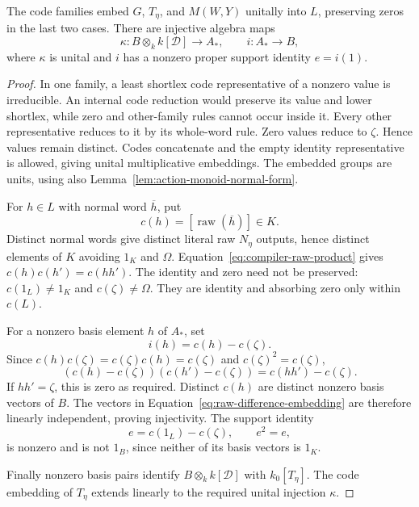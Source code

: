 \begin{lemma}\label{lem:encoding-embeddings}
The code families embed $G$, $T_\eta$, and
$M(W,Y)$ unitally into $L$, preserving
zeros in the last two cases.  There are
injective algebra maps
\begin{equation}\label{eq:encoding-algebra-maps}
 \kappa:B\otimes_k k[\mathcal D]\longrightarrow A_*,
 \qquad i:A_*\longrightarrow B,
\end{equation}
where $\kappa$ is unital and $i$ has a
nonzero proper support identity $e=i(1)$.
\end{lemma}

\begin{proof}
In one family, a least shortlex code
representative of a nonzero value is
irreducible.  An internal code reduction
would preserve its value and lower
shortlex, while zero and other-family
rules cannot occur inside it.  Every other
representative reduces to it by its
whole-word rule.  Zero values reduce
to $\zeta$.  Hence values remain distinct.
Codes concatenate and the empty identity
representative is allowed, giving unital
multiplicative embeddings.  The embedded
groups are units, using also
Lemma~\ref{lem:action-monoid-normal-form}.

For $h\in L$ with normal word $\overline h$, put
\[
 c(h)=[\operatorname{raw}(\overline h)]\in K.
\]
Distinct normal words give distinct
literal raw $N_\eta$ outputs, hence
distinct elements of $K$ avoiding
$1_K$ and $\Omega$.
Equation~\eqref{eq:compiler-raw-product}
gives $c(h)c(h')=c(hh')$.
The identity and zero need not be
preserved: $c(1_L)\ne1_K$ and
$c(\zeta)\ne\Omega$.  They are identity
and absorbing zero only within $c(L)$.

For a nonzero basis element $h$ of $A_*$, set
\begin{equation}\label{eq:raw-difference-embedding}
 i(h)=c(h)-c(\zeta).
\end{equation}
Since $c(h)c(\zeta)=c(\zeta)c(h)=c(\zeta)$
and $c(\zeta)^2=c(\zeta)$,
\[
 (c(h)-c(\zeta))(c(h')-c(\zeta))
     =c(hh')-c(\zeta).
\]
If $hh'=\zeta$, this is zero as required.
Distinct $c(h)$ are distinct nonzero
basis vectors of $B$.  The vectors in
Equation~\eqref{eq:raw-difference-embedding}
are therefore linearly independent,
proving injectivity.  The support identity
\[
 e=c(1_L)-c(\zeta),\qquad e^2=e,
\]
is nonzero and is not $1_B$, since neither
of its basis vectors is $1_K$.

Finally nonzero basis pairs identify
$B\otimes_k k[\mathcal D]$ with
$k_0[T_\eta]$.  The code embedding
of $T_\eta$ extends linearly to
the required unital injection $\kappa$.
\end{proof}

